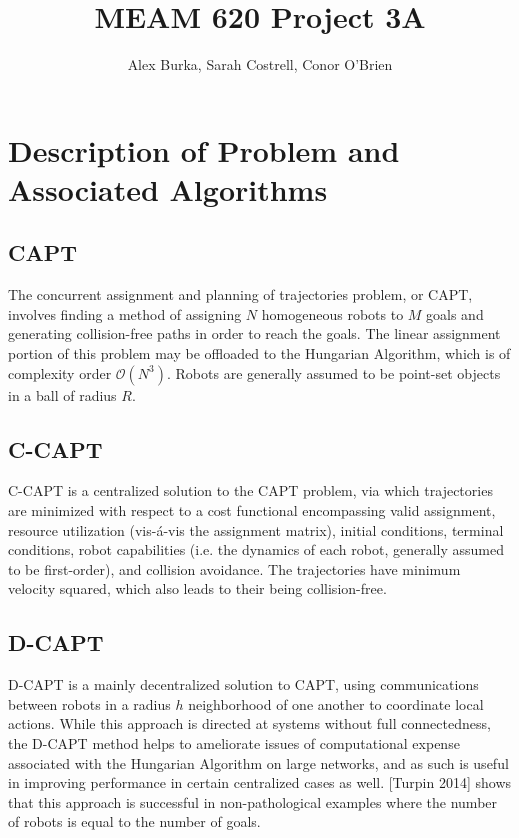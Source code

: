\documentclass[11pt]{article}
\begin{document}
\author{Alex Burka, Sarah Costrell, Conor O'Brien}
\title{MEAM 620 Project 3A}
\maketitle

\section{Description of Problem and Associated Algorithms}

\subsection{CAPT}
The concurrent assignment and planning of trajectories problem, or CAPT, involves finding a method of assigning $N$ homogeneous robots to $M$ goals and generating collision-free paths in order to reach the goals. The linear assignment portion of this problem may be offloaded to the Hungarian Algorithm, which is of complexity order $\mathcal{O}(N^3)$. Robots are generally assumed to be point-set objects in a ball of radius $R$.

\subsection{C-CAPT}
C-CAPT is a centralized solution to the CAPT problem, via which trajectories are minimized with respect to a cost functional encompassing valid assignment, resource utilization (vis-\'a-vis the assignment matrix), initial conditions, terminal conditions, robot capabilities (i.e. the dynamics of each robot, generally assumed to be first-order), and collision avoidance. The trajectories have minimum velocity squared, which also leads to their being collision-free. 

\subsection{D-CAPT}
D-CAPT is a mainly decentralized solution to CAPT, using communications between robots in a radius $h$ neighborhood of one another to coordinate local actions.  While this approach is directed at systems without full connectedness, the D-CAPT method helps to ameliorate issues of computational expense associated with the Hungarian Algorithm on large networks, and as such is useful in improving performance in certain centralized cases as well. [Turpin 2014] shows that this approach is successful in non-pathological examples where the number of robots is equal to the number of goals.
\end{document}
